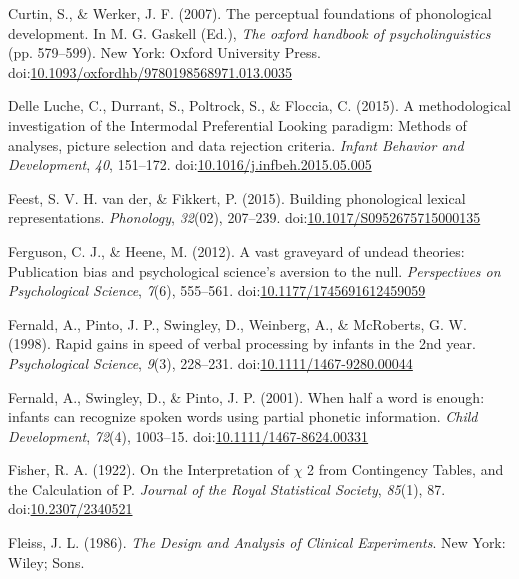 \documentclass[man]{apa6}
\begin{document}
\leavevmode\hypertarget{ref-Curtin2007}{}%
Curtin, S., \& Werker, J. F. (2007). The perceptual foundations of phonological development. In M. G. Gaskell (Ed.), \emph{The oxford handbook of psycholinguistics} (pp. 579--599). New York: Oxford University Press. doi:\href{https://doi.org/10.1093/oxfordhb/9780198568971.013.0035}{10.1093/oxfordhb/9780198568971.013.0035}

\leavevmode\hypertarget{ref-DelleLuche2015}{}%
Delle Luche, C., Durrant, S., Poltrock, S., \& Floccia, C. (2015). A methodological investigation of the Intermodal Preferential Looking paradigm: Methods of analyses, picture selection and data rejection criteria. \emph{Infant Behavior and Development}, \emph{40}, 151--172. doi:\href{https://doi.org/10.1016/j.infbeh.2015.05.005}{10.1016/j.infbeh.2015.05.005}

\leavevmode\hypertarget{ref-vanderFeest2015}{}%
Feest, S. V. H. van der, \& Fikkert, P. (2015). Building phonological lexical representations. \emph{Phonology}, \emph{32}(02), 207--239. doi:\href{https://doi.org/10.1017/S0952675715000135}{10.1017/S0952675715000135}

\leavevmode\hypertarget{ref-Ferguson2012}{}%
Ferguson, C. J., \& Heene, M. (2012). A vast graveyard of undead theories: Publication bias and psychological science's aversion to the null. \emph{Perspectives on Psychological Science}, \emph{7}(6), 555--561. doi:\href{https://doi.org/10.1177/1745691612459059}{10.1177/1745691612459059}

\leavevmode\hypertarget{ref-Fernald1998}{}%
Fernald, A., Pinto, J. P., Swingley, D., Weinberg, A., \& McRoberts, G. W. (1998). Rapid gains in speed of verbal processing by infants in the 2nd year. \emph{Psychological Science}, \emph{9}(3), 228--231. doi:\href{https://doi.org/10.1111/1467-9280.00044}{10.1111/1467-9280.00044}

\leavevmode\hypertarget{ref-Fernald2001a}{}%
Fernald, A., Swingley, D., \& Pinto, J. P. (2001). When half a word is enough: infants can recognize spoken words using partial phonetic information. \emph{Child Development}, \emph{72}(4), 1003--15. doi:\href{https://doi.org/10.1111/1467-8624.00331}{10.1111/1467-8624.00331}

\leavevmode\hypertarget{ref-Fisher1922}{}%
Fisher, R. A. (1922). On the Interpretation of \(\chi\) 2 from Contingency Tables, and the Calculation of P. \emph{Journal of the Royal Statistical Society}, \emph{85}(1), 87. doi:\href{https://doi.org/10.2307/2340521}{10.2307/2340521}

\leavevmode\hypertarget{ref-Fleiss1986}{}%
Fleiss, J. L. (1986). \emph{The Design and Analysis of Clinical Experiments}. New York: Wiley; Sons.
\end{document}
